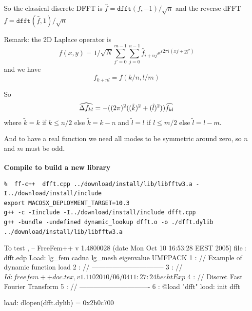 \documentclass[a4paper,twoside,12pt]{book}
\begin{document}
 So the classical discrete DFFT is  $\hat{f}=\mathtt{dfft}(f,-1)/\sqrt{n}$ and the
 reverse dFFT  $f=\mathtt{dfft}(\hat{f},1)/\sqrt{n}$

 \medskip

 Remark: the 2D Laplace operator is
 $$ f(x,y) = 1/\sqrt{N}  \sum_{j'=0}^{m-1} \sum_{j=0}^{n-1} \hat{f}_{i+nj} e^{\varepsilon  2\pi i (x j+ yj') } $$
 and we have
 $$ f_{k+nl} = f(k/n,l/m)$$


 So
 $$
     \widehat{\Delta f_{kl}} = -(  (2\pi)^2 ( (\tilde{k})^2+(\tilde{l})^2)) \widehat{ f_{kl}} \\
 $$
 where $ \tilde{k} = k $ if $ k \leq n/2 $ else $ \tilde{k} = k-n$ and
 $ \tilde{l} = l $ if $ l \leq m/2 $ else $ \tilde{l} = l-m$.

 And to have a real function we need all  modes to be symmetric around zero, so $n$ and $m$
 must be odd.
\\\\
{\bf  Compile to build a new library}

{\scriptsize
\begin{verbatim}
%  ff-c++  dfft.cpp ../download/install/lib/libfftw3.a -I../download/install/include
export MACOSX_DEPLOYMENT_TARGET=10.3
g++ -c -Iinclude -I../download/install/include dfft.cpp
g++ -bundle -undefined dynamic_lookup dfft.o -o ./dfft.dylib ../download/install/lib/libfftw3.a
\end{verbatim}
}

To test ,
\bFF
-- FreeFem++ v 1.4800028 (date Mon Oct 10 16:53:28 EEST 2005)
 file : dfft.edp
 Load: lg_fem cadna lg_mesh eigenvalue  UMFPACK
    1 : // Example of dynamic function load
    2 : // --------------------------------
    3 : // $Id: freefem++doc.tex,v 1.110 2010/06/04 11:27:24 hecht Exp $
    4 : //   Discret Fast Fourier Transform
    5 : // -------------------------------
    6 :  @load "dfft" lood: init dfft

load: dlopen(dfft.dylib) = 0x2b0c700
\end{document}

